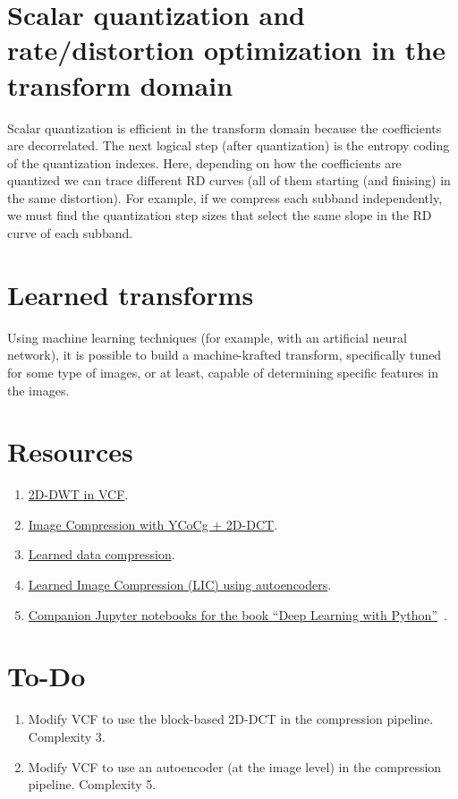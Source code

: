 \section{Scalar quantization and rate/distortion optimization in the transform domain}

Scalar quantization is efficient in the transform domain because the
coefficients are decorrelated. The next logical step (after
quantization) is the entropy coding of the quantization indexes. Here,
depending on how the coefficients are quantized we can trace different
RD curves (all of them starting (and finising) in the same
distortion). For example, if we compress each subband independently,
we must find the quantization step sizes that select the same slope in
the RD curve of each subband.

\section{Learned transforms}

Using machine learning techniques (for example, with an artificial
neural network), it is possible to build a machine-krafted transform,
specifically tuned for some type of images, or at least, capable of
determining specific features in the images.

\section{Resources}
\begin{enumerate}
\item \href{https://github.com/Sistemas-Multimedia/VCF/blob/main/src/DWT2D.py}{2D-DWT in VCF}.
\item
  \href{https://github.com/vicente-gonzalez-ruiz/DCT/blob/master/docs/YCoCg_2D_DCT_SQ.ipynb}{Image
    Compression with YCoCg + 2D-DCT}.
\item
  \href{https://www.tensorflow.org/tutorials/generative/data_compression}{Learned
    data compression}.
\item
  \href{https://github.com/vicente-gonzalez-ruiz/learned_image_compression/blob/main/LIC.ipynb}{Learned
    Image Compression (LIC) using autoencoders}.
\item
  \href{https://github.com/fchollet/deep-learning-with-python-notebooks}{Companion
    Jupyter notebooks for the book ``Deep Learning with
    Python''}~\cite{chollet2021deep}.
\end{enumerate}

\section{To-Do}
\begin{enumerate}
\item Modify VCF to use the block-based 2D-DCT in the compression pipeline. Complexity 3.
\item Modify VCF to use an autoencoder (at the image level) in the compression pipeline. Complexity 5. 
\end{enumerate}

